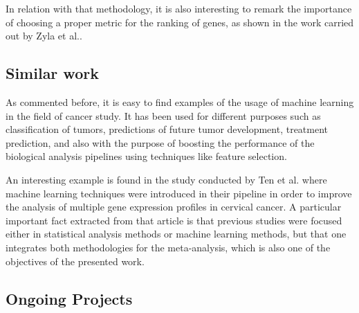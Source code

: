 In relation with that methodology, it is also interesting to remark the importance of choosing a proper metric for the ranking of genes, as shown in the work carried out by Zyla et al.\cite{Zyla2017}.

\subsection{Similar work}

As commented before, it is easy to find examples of the usage of machine learning in the field of cancer study. It has been used for different purposes such as classification of tumors, predictions of future tumor development, treatment prediction, and also with the purpose of boosting the performance of the biological analysis pipelines using techniques like feature selection.


An interesting example is found in the study conducted by Ten et al.\cite{Tan2018} where machine learning techniques were introduced in their pipeline in order to improve the analysis of multiple gene expression profiles in cervical cancer.
A particular important fact extracted from that article is that previous studies were focused either in statistical analysis methods or machine learning methods, but that one integrates both methodologies for the meta-analysis, which is also one of the objectives of the presented work.


\subsection{Ongoing Projects}
